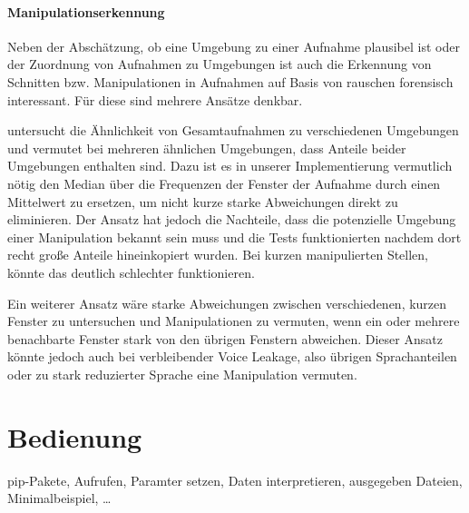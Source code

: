 \documentclass[
	fontsize=10.5pt,
	marginpar=false,
	ngerman,
	accentcolor=3d
	]{tudapub}
\begin{document}
\paragraph{Manipulationserkennung}
\label{manipulationdet}

Neben der Abschätzung, ob eine Umgebung zu einer Aufnahme plausibel ist oder der Zuordnung von Aufnahmen zu Umgebungen ist auch die Erkennung von Schnitten bzw. Manipulationen in Aufnahmen auf Basis von rauschen forensisch interessant. Für diese sind mehrere Ansätze denkbar.

\cite{ikram_digital_2010} untersucht die Ähnlichkeit von Gesamtaufnahmen zu verschiedenen Umgebungen und vermutet bei mehreren ähnlichen Umgebungen, dass Anteile beider Umgebungen enthalten sind. Dazu ist es in unserer Implementierung vermutlich nötig den Median über die Frequenzen der Fenster der Aufnahme durch einen Mittelwert zu ersetzen, um nicht kurze starke Abweichungen direkt zu eliminieren. Der Ansatz hat jedoch die Nachteile, dass die potenzielle Umgebung einer Manipulation bekannt sein muss und die Tests funktionierten nachdem dort recht große Anteile hineinkopiert wurden. Bei kurzen manipulierten Stellen, könnte das deutlich schlechter funktionieren.

Ein weiterer Ansatz wäre starke Abweichungen zwischen verschiedenen, kurzen Fenster zu untersuchen und Manipulationen zu vermuten, wenn ein oder mehrere benachbarte Fenster stark von den übrigen Fenstern abweichen. Dieser Ansatz könnte jedoch auch bei verbleibender Voice Leakage, also übrigen Sprachanteilen oder zu stark reduzierter Sprache eine Manipulation vermuten.

\pagebreak

\section{Bedienung}
\label{usage}

pip-Pakete, Aufrufen, Paramter setzen, Daten interpretieren, ausgegeben Dateien, Minimalbeispiel, …

\appendix




\pagebreak
\printbibliography


\end{document}
